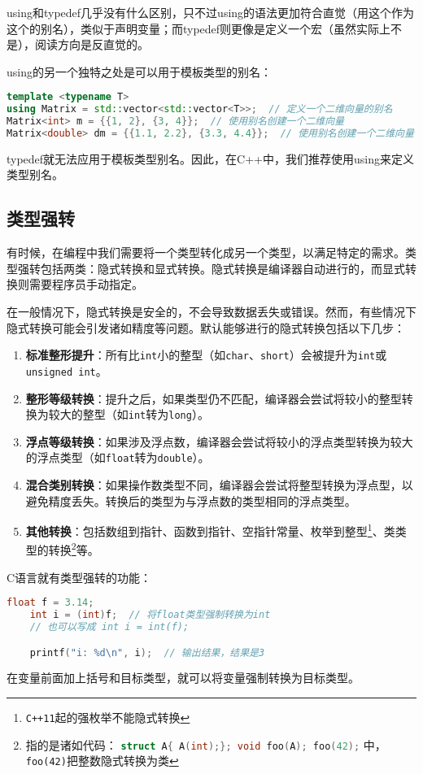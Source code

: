 \documentclass[../main.tex]{subfiles}
\begin{document}
using和typedef几乎没有什么区别，只不过using的语法更加符合直觉（用这个作为这个的别名），类似于声明变量；而typedef则更像是定义一个宏（虽然实际上不是），阅读方向是反直觉的。

using的另一个独特之处是可以用于模板类型的别名：
\begin{lstlisting}[language=C++]
template <typename T>
using Matrix = std::vector<std::vector<T>>;  // 定义一个二维向量的别名
Matrix<int> m = {{1, 2}, {3, 4}};  // 使用别名创建一个二维向量
Matrix<double> dm = {{1.1, 2.2}, {3.3, 4.4}};  // 使用别名创建一个二维向量
\end{lstlisting}
typedef就无法应用于模板类型别名。因此，在C++中，我们推荐使用using来定义类型别名。

\subsection{类型强转}

有时候，在编程中我们需要将一个类型转化成另一个类型，以满足特定的需求。类型强转包括两类：隐式转换和显式转换。隐式转换是编译器自动进行的，而显式转换则需要程序员手动指定。

在一般情况下，隐式转换是安全的，不会导致数据丢失或错误。然而，有些情况下隐式转换可能会引发诸如精度等问题。默认能够进行的隐式转换包括以下几步：
\begin{enumerate}
  \item \textbf{标准整形提升}：所有比\texttt{int}小的整型（如\texttt{char}、\texttt{short}）会被提升为\texttt{int}或\texttt{unsigned int}。
  \item \textbf{整形等级转换}：提升之后，如果类型仍不匹配，编译器会尝试将较小的整型转换为较大的整型（如\texttt{int}转为\texttt{long}）。
  \item \textbf{浮点等级转换}：如果涉及浮点数，编译器会尝试将较小的浮点类型转换为较大的浮点类型（如\texttt{float}转为\texttt{double}）。
  \item \textbf{混合类别转换}：如果操作数类型不同，编译器会尝试将整型转换为浮点型，以避免精度丢失。转换后的类型为与浮点数的类型相同的浮点类型。
  \item \textbf{其他转换}：包括数组到指针、函数到指针、空指针常量、枚举到整型\footnote{\texttt{C++11}起的强枚举不能隐式转换}、类类型的转换\footnote{指的是诸如代码： \lstinline[language=c++]|struct A{ A(int);}; void foo(A); foo(42);| 中，\texttt{foo(42)}把整数隐式转换为类}等。
\end{enumerate}

C语言就有类型强转的功能：
\begin{lstlisting}[language=C++]
    float f = 3.14;
    int i = (int)f;  // 将float类型强制转换为int
    // 也可以写成 int i = int(f);

    printf("i: %d\n", i);  // 输出结果，结果是3
\end{lstlisting}
在变量前面加上括号和目标类型，就可以将变量强制转换为目标类型。
\end{document}
